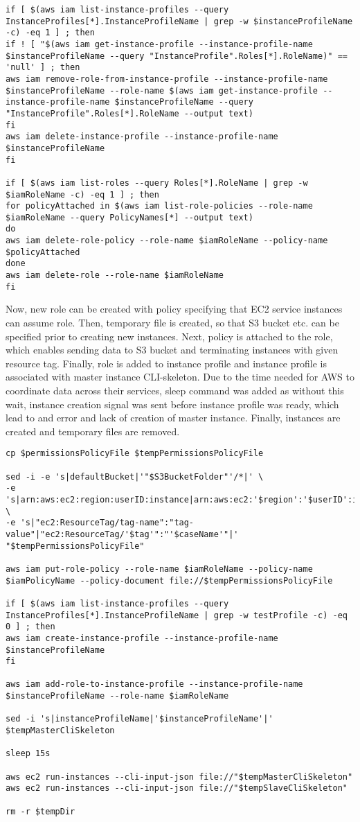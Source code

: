 \documentclass[11pt,english]{article}
\begin{document}
\begin{lstlisting}
if [ $(aws iam list-instance-profiles --query InstanceProfiles[*].InstanceProfileName | grep -w $instanceProfileName -c) -eq 1 ] ; then
if ! [ "$(aws iam get-instance-profile --instance-profile-name $instanceProfileName --query "InstanceProfile".Roles[*].RoleName)" == 'null' ] ; then
aws iam remove-role-from-instance-profile --instance-profile-name $instanceProfileName --role-name $(aws iam get-instance-profile --instance-profile-name $instanceProfileName --query "InstanceProfile".Roles[*].RoleName --output text)
fi
aws iam delete-instance-profile --instance-profile-name $instanceProfileName
fi

if [ $(aws iam list-roles --query Roles[*].RoleName | grep -w $iamRoleName -c) -eq 1 ] ; then
for policyAttached in $(aws iam list-role-policies --role-name $iamRoleName --query PolicyNames[*] --output text)
do
aws iam delete-role-policy --role-name $iamRoleName --policy-name $policyAttached
done
aws iam delete-role --role-name $iamRoleName
fi
\end{lstlisting}
Now, new role can be created with policy specifying that EC2 service instances can assume role. Then, temporary file is created, so that S3 bucket etc. can be specified prior to creating new instances. Next, policy is attached to the role, which enables sending data to S3 bucket and terminating instances with given resource tag. Finally, role is added to instance profile and instance profile is associated with master instance CLI-skeleton. Due to the time needed for AWS to coordinate data across their services, sleep command was added as without this wait, instance creation signal was sent before instance profile was ready, which lead to and error and lack of creation of master instance. Finally, instances are created and temporary files are removed.
\begin{lstlisting}
cp $permissionsPolicyFile $tempPermissionsPolicyFile

sed -i -e 's|defaultBucket|'"$S3BucketFolder"'/*|' \
-e 's|arn:aws:ec2:region:userID:instance|arn:aws:ec2:'$region':'$userID':instance|' \
-e 's|"ec2:ResourceTag/tag-name":"tag-value"|"ec2:ResourceTag/'$tag'":"'$caseName'"|' "$tempPermissionsPolicyFile"

aws iam put-role-policy --role-name $iamRoleName --policy-name $iamPolicyName --policy-document file://$tempPermissionsPolicyFile

if [ $(aws iam list-instance-profiles --query InstanceProfiles[*].InstanceProfileName | grep -w testProfile -c) -eq 0 ] ; then
aws iam create-instance-profile --instance-profile-name $instanceProfileName
fi

aws iam add-role-to-instance-profile --instance-profile-name $instanceProfileName --role-name $iamRoleName

sed -i 's|instanceProfileName|'$instanceProfileName'|' $tempMasterCliSkeleton

sleep 15s

aws ec2 run-instances --cli-input-json file://"$tempMasterCliSkeleton"
aws ec2 run-instances --cli-input-json file://"$tempSlaveCliSkeleton"

rm -r $tempDir
\end{lstlisting}
\end{document}
